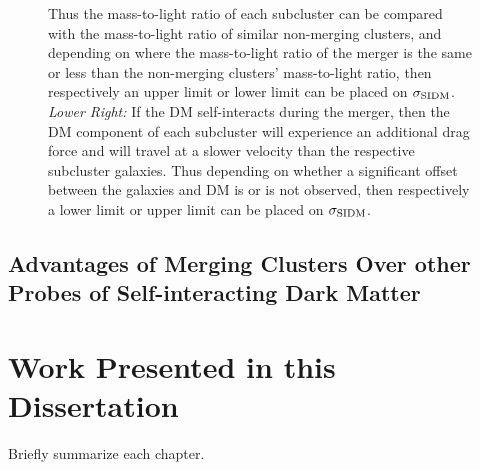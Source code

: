 \begin{figure}
{Thus the mass-to-light ratio of each subcluster can be compared with the mass-to-light ratio of similar non-merging clusters, and depending on where the mass-to-light ratio of the merger is the same or less than the non-merging clusters' mass-to-light ratio, then respectively an upper limit or lower limit can be placed on $\sigma_{\rm SIDM}$.
\emph{Lower Right:} If the DM self-interacts during the merger, then the DM component of each subcluster will experience an additional drag force and will travel at a slower velocity than the respective subcluster galaxies.
Thus depending on whether a significant offset between the galaxies and DM is or is not observed, then respectively a lower limit or upper limit can be placed on $\sigma_{\rm SIDM}$.
\label{fig:4ConstraintMethods}}
\end{figure}

\subsection{Advantages of Merging Clusters Over other Probes of Self-interacting Dark Matter}

\section{Work Presented in this Dissertation}
Briefly summarize each chapter.
